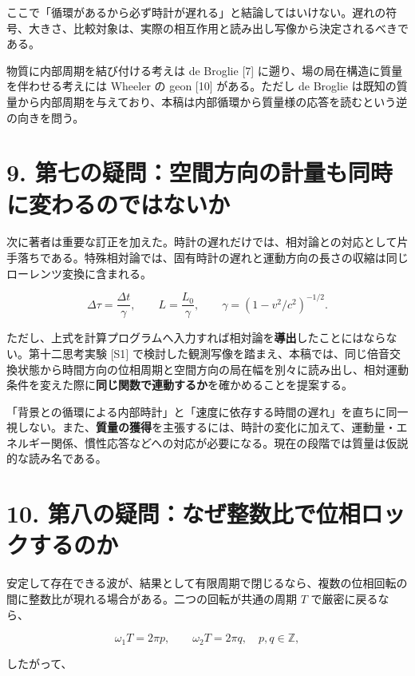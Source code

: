 \documentclass[
  a4paper,
]{ltjsarticle}
\begin{document}
ここで「循環があるから必ず時計が遅れる」と結論してはいけない。遅れの符号、大きさ、比較対象は、実際の相互作用と読み出し写像から決定されるべきである。

物質に内部周期を結び付ける考えは de Broglie {[}7{]}
に遡り、場の局在構造に質量を伴わせる考えには Wheeler の geon {[}10{]}
がある。ただし de Broglie
は既知の質量から内部周期を与えており、本稿は内部循環から質量様の応答を読むという逆の向きを問う。

\section{9.
第七の疑問：空間方向の計量も同時に変わるのではないか}\label{ux7b2cux4e03ux306eux7591ux554fux7a7aux9593ux65b9ux5411ux306eux8a08ux91cfux3082ux540cux6642ux306bux5909ux308fux308bux306eux3067ux306fux306aux3044ux304b}

次に著者は重要な訂正を加えた。時計の遅れだけでは、相対論との対応として片手落ちである。特殊相対論では、固有時計の遅れと運動方向の長さの収縮は同じローレンツ変換に含まれる。

\[
\Delta\tau=\frac{\Delta t}{\gamma},\qquad
L=\frac{L_0}{\gamma},\qquad
\gamma=(1-v^2/c^2)^{-1/2}.
\]

ただし、上式を計算プログラムへ入力すれば相対論を\textbf{導出}したことにはならない。第十二思考実験
{[}S1{]}
で検討した観測写像を踏まえ、本稿では、同じ倍音交換状態から時間方向の位相周期と空間方向の局在幅を別々に読み出し、相対運動条件を変えた際に\textbf{同じ関数で連動するか}を確かめることを提案する。

「背景との循環による内部時計」と「速度に依存する時間の遅れ」を直ちに同一視しない。また、\textbf{質量の獲得}を主張するには、時計の変化に加えて、運動量・エネルギー関係、慣性応答などへの対応が必要になる。現在の段階では質量は仮説的な読み名である。

\section{10.
第八の疑問：なぜ整数比で位相ロックするのか}\label{ux7b2cux516bux306eux7591ux554fux306aux305cux6574ux6570ux6bd4ux3067ux4f4dux76f8ux30edux30c3ux30afux3059ux308bux306eux304b}

安定して存在できる波が、結果として有限周期で閉じるなら、複数の位相回転の間に整数比が現れる場合がある。二つの回転が共通の周期
\(T\) で厳密に戻るなら、

\[
\omega_1T=2\pi p,\qquad
\omega_2T=2\pi q,
\quad p,q\in\mathbb Z,
\]

したがって、
\end{document}
